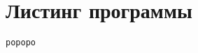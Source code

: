 \section{Листинг программы}
\label{cha:Листинг программы}


\begin{lstlisting}[caption=Файл name.cs]
ророро
\end{lstlisting}
%
